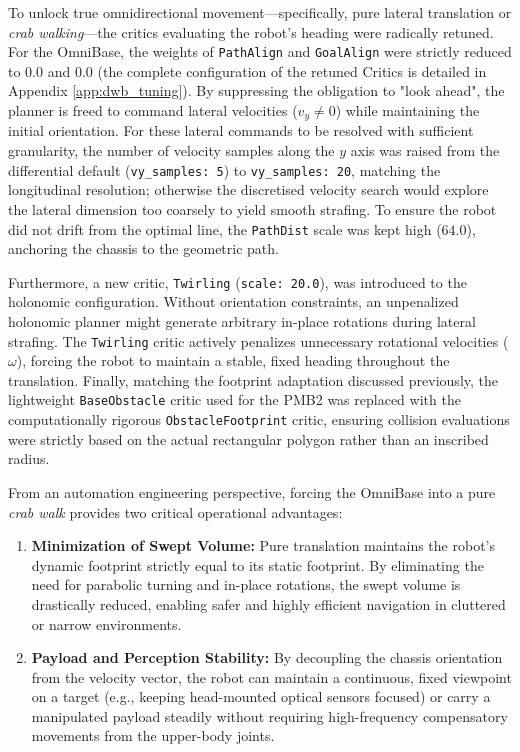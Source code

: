 To unlock true omnidirectional movement—specifically, pure lateral translation or \textit{crab walking}—the critics evaluating the robot's heading were radically retuned. For the OmniBase, the weights of \texttt{PathAlign} and \texttt{GoalAlign} were strictly reduced to $0.0$ and $0.0$ (the complete configuration of the retuned Critics is detailed in Appendix \ref{app:dwb_tuning}). By suppressing the obligation to "look ahead", the planner is freed to command lateral velocities ($v_y \neq 0$) while maintaining the initial orientation. For these lateral commands to be resolved with sufficient granularity, the number of velocity samples along the $y$ axis was raised from the differential default (\texttt{vy\_samples: 5}) to \texttt{vy\_samples: 20}, matching the longitudinal resolution; otherwise the discretised velocity search would explore the lateral dimension too coarsely to yield smooth strafing. To ensure the robot did not drift from the optimal line, the \texttt{PathDist} scale was kept high ($64.0$), anchoring the chassis to the geometric path. 

Furthermore, a new critic, \texttt{Twirling} (\texttt{scale: 20.0}), was introduced to the holonomic configuration. Without orientation constraints, an unpenalized holonomic planner might generate arbitrary in-place rotations during lateral strafing. The \texttt{Twirling} critic actively penalizes unnecessary rotational velocities ($\omega$), forcing the robot to maintain a stable, fixed heading throughout the translation. Finally, matching the footprint adaptation discussed previously, the lightweight \texttt{BaseObstacle} critic used for the PMB2 was replaced with the computationally rigorous \texttt{ObstacleFootprint} critic, ensuring collision evaluations were strictly based on the actual rectangular polygon rather than an inscribed radius.

From an automation engineering perspective, forcing the OmniBase into a pure \textit{crab walk} provides two critical operational advantages:
\begin{enumerate}
    \item \textbf{Minimization of Swept Volume:} Pure translation maintains the robot's dynamic footprint strictly equal to its static footprint. By eliminating the need for parabolic turning and in-place rotations, the swept volume is drastically reduced, enabling safer and highly efficient navigation in cluttered or narrow environments.
    \item \textbf{Payload and Perception Stability:} By decoupling the chassis orientation from the velocity vector, the robot can maintain a continuous, fixed viewpoint on a target (e.g., keeping head-mounted optical sensors focused) or carry a manipulated payload steadily without requiring high-frequency compensatory movements from the upper-body joints.
\end{enumerate}

